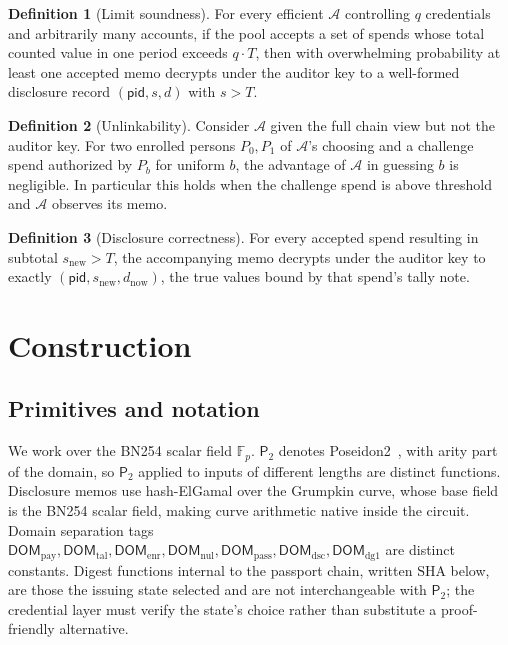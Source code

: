 \documentclass[11pt,a4paper]{article}
\theoremstyle{definition}
\newtheorem{definition}{Definition}
\theoremstyle{plain}
\theoremstyle{remark}
\newcommand{\pid}{\ensuremath{\mathsf{pid}}}
\newcommand{\PT}{\ensuremath{\mathsf{P}_2}}
\newcommand{\adv}{\ensuremath{\mathcal{A}}}
\begin{document}
\begin{definition}[Limit soundness]
For every efficient $\adv$ controlling $q$ credentials and arbitrarily many accounts, if the pool accepts a set of spends whose total counted value in one period exceeds $q \cdot T$, then with overwhelming probability at least one accepted memo decrypts under the auditor key to a well-formed disclosure record $(\pid, s, d)$ with $s > T$.
\end{definition}

\begin{definition}[Unlinkability]
Consider $\adv$ given the full chain view but not the auditor key. For two enrolled persons $P_0, P_1$ of $\adv$'s choosing and a challenge spend authorized by $P_b$ for uniform $b$, the advantage of $\adv$ in guessing $b$ is negligible. In particular this holds when the challenge spend is above threshold and $\adv$ observes its memo.
\end{definition}

\begin{definition}[Disclosure correctness]
For every accepted spend resulting in subtotal $s_{\mathrm{new}} > T$, the accompanying memo decrypts under the auditor key to exactly $(\pid, s_{\mathrm{new}}, d_{\mathrm{now}})$, the true values bound by that spend's tally note.
\end{definition}

\section{Construction}
\label{sec:construction}

\subsection{Primitives and notation}

We work over the BN254 scalar field $\mathbb{F}_p$. $\PT$ denotes Poseidon2~\cite{poseidon2}, with arity part of the domain, so $\PT$ applied to inputs of different lengths are distinct functions. Disclosure memos use hash-ElGamal over the Grumpkin curve, whose base field is the BN254 scalar field, making curve arithmetic native inside the circuit. Domain separation tags $\mathsf{DOM}_{\mathrm{pay}}, \mathsf{DOM}_{\mathrm{tal}}, \mathsf{DOM}_{\mathrm{enr}}, \mathsf{DOM}_{\mathrm{nul}}, \mathsf{DOM}_{\mathrm{pass}}, \mathsf{DOM}_{\mathrm{dsc}}, \mathsf{DOM}_{\mathrm{dg1}}$ are distinct constants. Digest functions internal to the passport chain, written $\mathrm{SHA}$ below, are those the issuing state selected and are not interchangeable with $\PT$; the credential layer must verify the state's choice rather than substitute a proof-friendly alternative.
\end{document}
